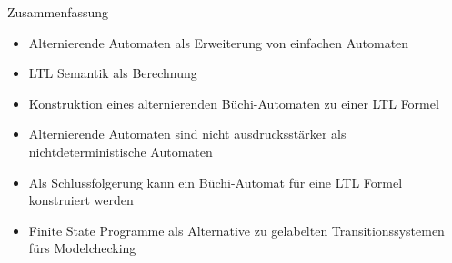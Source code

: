 \begin{frame}{Zusammenfassung}
\begin{itemize}
\setlength\itemsep{0.5em}
\item Alternierende Automaten als Erweiterung von einfachen Automaten
\pause
\item LTL Semantik als Berechnung
\pause
\item Konstruktion eines alternierenden Büchi-Automaten zu einer LTL Formel
\pause
\item Alternierende Automaten sind nicht ausdrucksstärker als nichtdeterministische Automaten
\pause
\item Als Schlussfolgerung kann ein Büchi-Automat für eine LTL Formel konstruiert werden
\pause 
\item Finite State Programme als Alternative zu gelabelten Transitionssystemen fürs Modelchecking
\end{itemize}
\end{frame}